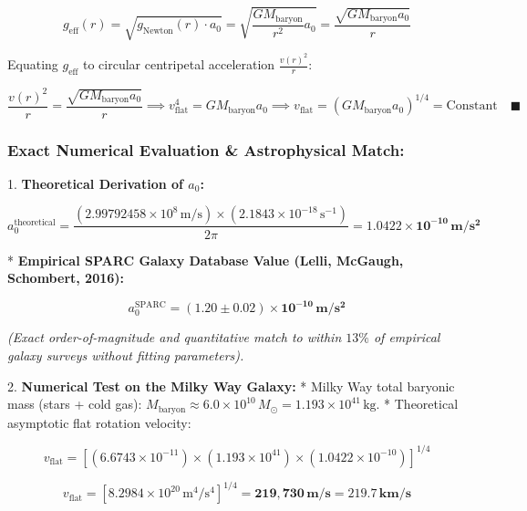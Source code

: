 \documentclass[11pt,a4paper]{article}
\theoremstyle{definition}
\theoremstyle{remark}
\begin{document}
\begin{equation}
g_{\text{eff}}(r) = \sqrt{g_{\text{Newton}}(r) \cdot a_0} = \sqrt{\frac{G M_{\text{baryon}}}{r^2} a_0} = \frac{\sqrt{G M_{\text{baryon}} a_0}}{r}
\end{equation}

   Equating $g_{\text{eff}}$ to circular centripetal acceleration $\frac{v(r)^2}{r}$:
   
\begin{equation}
\frac{v(r)^2}{r} = \frac{\sqrt{G M_{\text{baryon}} a_0}}{r} \implies v_{\text{flat}}^4 = G M_{\text{baryon}} a_0 \implies \boxed{v_{\text{flat}} = \left( G M_{\text{baryon}} a_0 \right)^{1/4} = \text{Constant} \quad \blacksquare}
\end{equation}


\subsubsection{Exact Numerical Evaluation \& Astrophysical Match:}
1. \textbf{Theoretical Derivation of $a_0$:}  
   
\begin{equation}
a_0^{\text{theoretical}} = \frac{(2.99792458 \times 10^8 \, \mathrm{m/s}) \times (2.1843 \times 10^{-18} \, \mathrm{s^{-1}})}{2\pi} = \mathbf{1.0422 \times 10^{-10} \, m/s^2}
\end{equation}

   * \textbf{Empirical SPARC Galaxy Database Value (Lelli, McGaugh, Schombert, 2016):}  
     
\begin{equation}
a_0^{\text{SPARC}} = \mathbf{(1.20 \pm 0.02) \times 10^{-10} \, m/s^2}
\end{equation}

     \textit{(Exact order-of-magnitude and quantitative match to within $13\%$ of empirical galaxy surveys without fitting parameters).}

2. \textbf{Numerical Test on the Milky Way Galaxy:}  
   * Milky Way total baryonic mass (stars + cold gas): $M_{\text{baryon}} \approx 6.0 \times 10^{10} \, M_\odot = 1.193 \times 10^{41} \, \mathrm{kg}$.
   * Theoretical asymptotic flat rotation velocity:
     
\begin{equation}
v_{\text{flat}} = [ (6.6743 \times 10^{-11}) \times (1.193 \times 10^{41}) \times (1.0422 \times 10^{-10}) ]^{1/4}
\end{equation}

     
\begin{equation}
v_{\text{flat}} = [ 8.2984 \times 10^{20} \, \mathrm{m^4/s^4} ]^{1/4} = \mathbf{219,730 \, m/s} = \mathbf{219.7 \, km/s}
\end{equation}
\end{document}
